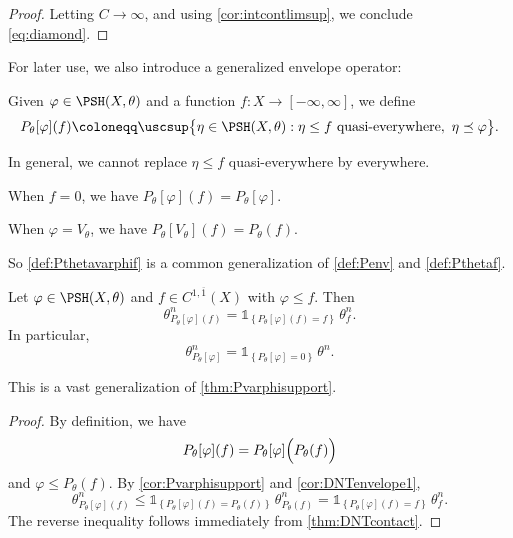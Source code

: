 \begin{proof}
    Letting $C\to\infty$, and using \cref{cor:intcontlimsup}, we conclude \eqref{eq:diamond}.
\end{proof}


For later use, we also introduce a generalized envelope operator:
\begin{definition}\label{def:Pthetavarphif}
Given $\varphi\in\PSH(X,\theta)$ and a function $f\colon X\to[-\infty,\infty]$, we define
\[
P_\theta[\varphi](f)\coloneqq \uscsup \bigl\{\eta\in\PSH(X,\theta): \eta\leq f\textup{ quasi-everywhere},\ \eta\preceq\varphi\bigr\}.
\]
\end{definition}
In general, we cannot replace $\eta\leq f$ quasi-everywhere by everywhere.


\begin{example}\label{ex:envelopes:L625}
    When $f=0$, we have $P_\theta[\varphi](f)=P_{\theta}[\varphi]$.

    When $\varphi=V_{\theta}$, we have $P_\theta[V_{\theta}](f)=P_{\theta}(f)$.

    So \cref{def:Pthetavarphif} is a common generalization of \cref{def:Penv} and \cref{def:Pthetaf}.
\end{example}


\begin{proposition}\label{prop:DNTenvelope2}
    Let $\varphi\in\PSH(X,\theta)$ and $f\in C^{1,\overline{1}}(X)$ with $\varphi\leq f$. Then
    \[
    \theta^n_{P_\theta[\varphi](f)} = \mathds{1}_{\left\{P_\theta[\varphi](f)=f\right\}}\,\theta^n_f.
    \]
    In particular,
    \[
    \theta^n_{P_\theta[\varphi]} = \mathds{1}_{\left\{P_\theta[\varphi]=0\right\}}\,\theta^n.
    \]
\end{proposition}
This is a vast generalization of \cref{thm:Pvarphisupport}.
\begin{proof}
    By definition, we have
    \[
    P_\theta[\varphi](f)=P_\theta[\varphi]\Bigl(P_\theta(f)\Bigr)
    \]
    and $\varphi\leq P_\theta(f)$. By \cref{cor:Pvarphisupport} and \cref{cor:DNTenvelope1},
    \[
        \theta^n_{P_\theta[\varphi](f)} \leq \mathds{1}_{\left\{P_\theta[\varphi](f)=P_\theta(f)\right\}}\,\theta^n_{P_\theta(f)} = \mathds{1}_{\left\{P_\theta[\varphi](f)=f\right\}}\,\theta^n_f.
    \]
    The reverse inequality follows immediately from \cref{thm:DNTcontact}.
\end{proof}


